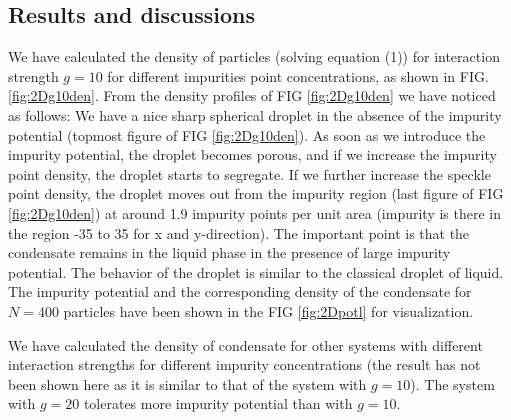 \documentclass[amsmath,amssymb,lengthcheck,aps,prl] {revtex4}
\begin{document}
\subsection{Results and discussions}

We have calculated the density of particles (solving equation (1)) for interaction strength $g=10$ for different impurities point concentrations, as shown in FIG. \ref{fig:2Dg10den}. From the density profiles of FIG \ref{fig:2Dg10den}  we have noticed as follows:
We have a nice sharp spherical droplet in the absence of the impurity potential (topmost figure of FIG \ref{fig:2Dg10den}). As soon as we introduce the impurity potential, the droplet becomes porous, and if we increase the impurity point density, the droplet starts to segregate. If we further increase the speckle point density, the droplet moves out from the impurity region (last figure of FIG \ref{fig:2Dg10den}) at around 1.9 impurity points per unit area (impurity is there in the region -35 to 35 for x and y-direction). The important point is that the condensate remains in the liquid phase in the presence of large impurity potential.
The behavior of the droplet is similar to the classical droplet of liquid.
The impurity potential and the corresponding density of the condensate for $N=400$ particles have been shown in the FIG \ref{fig:2Dpotl} for visualization.

We have calculated the density of condensate for other systems with different interaction strengths for different impurity concentrations (the result has not been shown here as it is similar to that of the system with $g=10$). 
 The system with $g=20$ tolerates more impurity potential than with $g=10$. 
\end{document}
